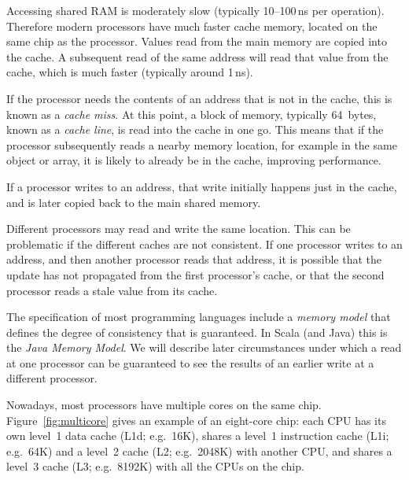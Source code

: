 Accessing shared RAM is moderately slow (typically 10--100\,ns per operation).
Therefore modern processors have much faster cache memory, located on the same
chip as the processor.  Values read from the main memory are copied into the
cache.  A subsequent read of the same address will read that value from the
cache, which is much faster (typically around 1\,ns).

If the processor needs the contents of an address that is not in the cache,
this is known as a \emph{cache miss}.  At this point, a block of memory,
typically 64~bytes, known as a \emph{cache line}, is read into the cache in
one go.  This means that if the processor subsequently reads a nearby memory
location, for example in the same object or array, it is likely to already be
in the cache, improving performance.
  
If a processor writes to an address, that write initially happens just in the
cache, and is later copied back to the main shared memory.

Different processors may read and write the same location.  This can be
problematic if the different caches are not consistent.  If one processor
writes to an address, and then another processor reads that address, it is
possible that the update has not propagated from the first processor's cache,
or that the second processor reads a stale value from its cache.  

The specification of most programming languages include a \emph{memory model}
that defines the degree of consistency that is guaranteed.  In Scala (and
Java) this is the \emph{Java Memory Model}.  We will describe later
circumstances under which a read at one processor can be guaranteed to see the
results of an earlier write at a different processor.



Nowadays, most processors have multiple cores on the same chip.
Figure~\ref{fig:multicore} gives an example of an eight-core chip: each CPU
has its own level~1 data cache (L1d; e.g.~16K), shares a level~1 instruction
cache (L1i; e.g.~64K) and a level~2 cache (L2; e.g.~2048K) with another CPU,
and shares a level~3 cache (L3; e.g.~8192K) with all the CPUs on the chip.



